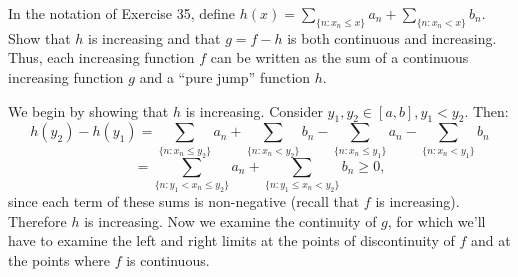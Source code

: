\begin{exercise}{36}
    In the notation of Exercise 35, define $h(x) = \sum_{\{n: x_n \leq x\}} a_n + \sum_{\{n: x_n < x\}} b_n$.
    Show that $h$ is increasing and that $g = f - h$ is both continuous and increasing.
    Thus, each increasing function $f$ can be written as the sum of a continuous increasing function $g$ and a ``pure jump'' function $h$.
\end{exercise}

\begin{solution}
    
    We begin by showing that $h$ is increasing.
    Consider $y_1, y_2 \in [a, b], y_1 < y_2$.
    Then:
    $$h(y_2) - h(y_1) = \sum_{\{n: x_n \leq y_2\}} a_n + \sum_{\{n: x_n < y_2\}} b_n - \sum_{\{n: x_n \leq y_1\}} a_n - \sum_{\{n: x_n < y_1\}} b_n$$
    $$ = \sum_{\{n: y_1 < x_n \leq y_2\}} a_n + \sum_{\{n: y_1 \leq x_n < y_2\}} b_n \geq 0,$$
    since each term of these sums is non-negative (recall that $f$ is increasing).
    Therefore $h$ is increasing.
    Now we examine the continuity of $g$, for which we'll have to examine the left and right limits at the points of discontinuity of $f$ and at the points where $f$ is continuous.


\end{solution}
